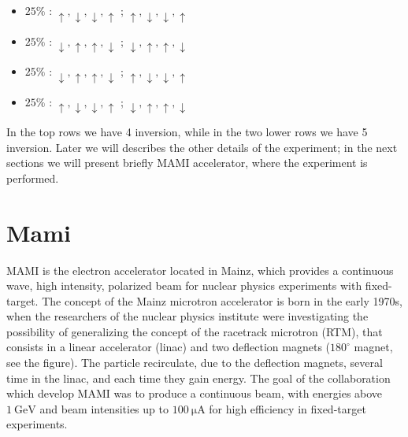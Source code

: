 \begin{itemize}
\item $25\%$ : $\uparrow,\downarrow,\downarrow, \uparrow$ ; $\uparrow,\downarrow,\downarrow, \uparrow$
\item $25\%$ : $\downarrow,\uparrow, \uparrow,\downarrow$ ; $\downarrow,\uparrow, \uparrow,\downarrow$
\item $25\%$ : $\downarrow,\uparrow, \uparrow,\downarrow$ ; $\uparrow,\downarrow,\downarrow, \uparrow$
\item $25\%$ : $\uparrow,\downarrow,\downarrow, \uparrow$ ; $\downarrow,\uparrow, \uparrow,\downarrow$
\end{itemize}

In the top rows we have 4 inversion, while in the two lower rows we have 5 inversion. \smallskip
Later we will describes the other details of the experiment; in the next sections we will present briefly MAMI accelerator, where the experiment is performed. 

\section{Mami}

MAMI is the electron accelerator located in Mainz, which provides a continuous wave, high intensity, polarized beam for nuclear physics experiments with fixed-target. The concept of the Mainz microtron accelerator is born in the early 1970s, when the researchers of the nuclear physics institute were investigating the possibility of generalizing the concept of the racetrack microtron (RTM), that consists in a linear accelerator (linac) and two deflection magnets ($180^{\circ}$ magnet, see the figure). The particle recirculate, due to the deflection magnets, several time in the linac, and each time they gain energy.  The goal of the collaboration which develop MAMI was to produce a continuous beam, with energies above $\SI{1}{\giga \electronvolt}$ and beam intensities up to $\SI{100}{\micro \ampere}$ for high efficiency in fixed-target experiments.

